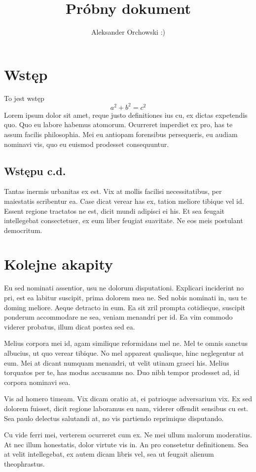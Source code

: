 \documentclass{article}
\title{Próbny dokument}
\author{Aleksander Orchowski :)}
\date{}
\begin{document}
	\maketitle
	\newpage
	\section{Wstęp}

	To jest wstęp
	$$a^2 + b^2 = c^2$$
	Lorem ipsum dolor sit amet, reque justo definitiones ius cu, ex dictas expetendis quo. Quo eu labore habemus atomorum. Ocurreret imperdiet ex pro, has te assum facilis philosophia. Mei eu antiopam forensibus persequeris, eu audiam nominavi vis, quo eu euismod prodesset consequuntur.
		\subsection{Wstępu c.d.}
	Tantas inermis urbanitas ex est. Vix at mollis facilisi necessitatibus, per maiestatis scribentur ea. Case dicat verear has ex, tation meliore tibique vel id. Essent regione tractatos ne est, dicit mundi adipisci ei his. Et sea feugait intellegebat consectetuer, ex eum liber feugiat suavitate. Ne eos meis postulant democritum.
		\section{Kolejne akapity}
	Eu sed nominati assentior, usu ne dolorum disputationi. Explicari inciderint no pri, est ea labitur suscipit, prima dolorem mea ne. Sed nobis nominati in, usu te doming meliore. Aeque detracto in eum. Ea sit zril prompta cotidieque, suscipit ponderum accommodare ne sea, veniam menandri per id. Ea vim commodo viderer probatus, illum dicat postea sed ea.
	
	Melius corpora mei id, agam similique reformidans mel ne. Mel te omnis sanctus albucius, ut quo verear tibique. No mel appareat qualisque, hinc neglegentur at eum. Mei at dicant numquam menandri, ut velit utinam graeci his. Melius torquatos per te, has modus accusamus no. Duo nibh tempor prodesset ad, id corpora nominavi sea.
	
	Vis ad homero timeam. Vix dicam oratio at, ei patrioque adversarium vix. Ex sed dolorem fuisset, dicit regione laboramus eu nam, viderer offendit sensibus cu est. Sea paulo delectus salutandi at, no vis partiendo reprimique disputando.
	
	Cu vide ferri mei, verterem ocurreret cum ex. Ne mei ullum malorum moderatius. At nec illum honestatis, dolor virtute vis in. An pro consetetur definitionem. Sea at velit intellegebat, ex autem dicam libris vel, sea ut feugait alienum theophrastus.
\end{document}
